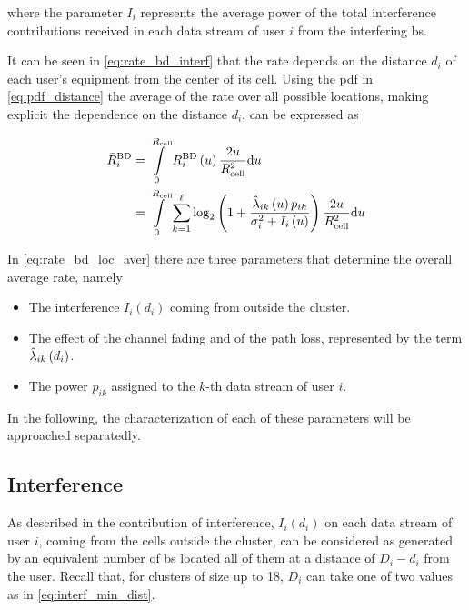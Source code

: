 \noindent
where the parameter $I_i$ represents the average power of the total interference
contributions received in each data stream of user $i$ from the interfering
\gls{bs}.

It can be seen in \eqref{eq:rate_bd_interf} that the rate depends on the distance $d_i$ of each user's equipment from the center of its cell. Using the pdf in
\eqref{eq:pdf_distance} the average of the rate over all possible locations,
making explicit the dependence on the distance $d_i$, can be expressed as

\begin{equation} \label{eq:rate_bd_loc_aver}
\begin{aligned}
    \bar{R}_i^{\text{BD}} &= \int\limits_0^{R_{\text{cell}}} R_i^{\text{BD}}\left(u
    \right) \frac{2u}{R_{\text{cell}}^2} \text{d} u \\
    &= \int\limits_0^{R_{\text{cell}}} \sum\limits_{k = 1}^{\ell} \log_2 \left(1 +
    \frac{\hat{\lambda}_{ik}\left(u\right) p_{ik}}{\sigma_i^2 + I_i\left(u\right)}
    \right) \frac{2u}{R_{\text{cell}}^2} \text{d} u
\end{aligned}
\end{equation}

In \eqref{eq:rate_bd_loc_aver} there are three parameters that determine the
overall average rate, namely

\begin{itemize}
    \item The interference $I_i\left(d_i\right)$ coming from outside the
        cluster.
    \item The effect of the channel fading and of the path loss, represented by
        the term $\hat{\lambda}_{ik}\left(d_i\right)$.
    \item The power $p_{ik}$ assigned to the $k$-th data stream of user $i$.
\end{itemize}

In the following, the characterization of each of these parameters will be
approached separatedly.

\subsection{Interference}\label{ssec:achiev_rate_interf}

As described in  the contribution of interference,
$I_i\left(d_i\right)$ on each data stream of user $i$, coming from the cells
outside the cluster, can be considered as generated by an equivalent number of
\gls{bs} located all of them at a distance of $D_i - d_i$ from the user. Recall
that, for clusters of size up to 18, $D_i$ can take one of two values as in
\eqref{eq:interf_min_dist}.

